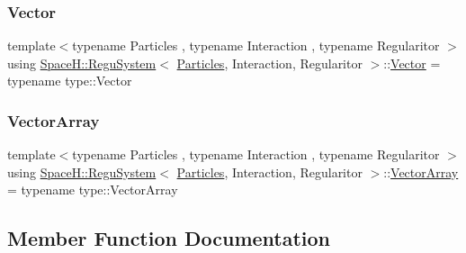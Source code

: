 \mbox{\label{class_space_h_1_1_regu_system_a26cc9ed7fee2c1b376993fe6ca010190}} 
\subsubsection{\texorpdfstring{Vector}{Vector}}
{\footnotesize\ttfamily template$<$typename Particles , typename Interaction , typename Regularitor $>$ \\
using \mbox{\hyperlink{class_space_h_1_1_regu_system}{Space\+H\+::\+Regu\+System}}$<$ \mbox{\hyperlink{struct_space_h_1_1_particles}{Particles}}, Interaction, Regularitor $>$\+::\mbox{\hyperlink{class_space_h_1_1_regu_system_a26cc9ed7fee2c1b376993fe6ca010190}{Vector}} =  typename type\+::\+Vector}

\mbox{\label{class_space_h_1_1_regu_system_a506e965b0be781a4143b1f2311f98da9}} 
\subsubsection{\texorpdfstring{Vector\+Array}{VectorArray}}
{\footnotesize\ttfamily template$<$typename Particles , typename Interaction , typename Regularitor $>$ \\
using \mbox{\hyperlink{class_space_h_1_1_regu_system}{Space\+H\+::\+Regu\+System}}$<$ \mbox{\hyperlink{struct_space_h_1_1_particles}{Particles}}, Interaction, Regularitor $>$\+::\mbox{\hyperlink{class_space_h_1_1_regu_system_a506e965b0be781a4143b1f2311f98da9}{Vector\+Array}} =  typename type\+::\+Vector\+Array}



\subsection{Member Function Documentation}
\mbox{\label{class_space_h_1_1_regu_system_a86d3f6978e184f6cdd91a70eda2b5789}} 
